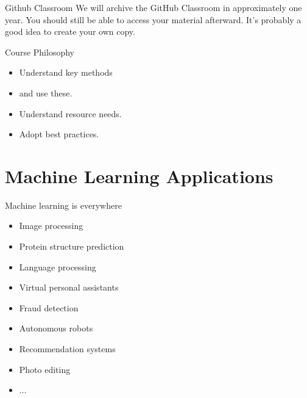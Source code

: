 \documentclass{beamer}
\begin{document}
    \begin{frame}{Github Classroom}
      We will archive the GitHub Classroom in approximately one year. You should still be able to
      access your material afterward. It's probably a good idea to create your own copy.
    \end{frame}

    \begin{frame}{Course Philosophy}
      \begin{itemize}
        \item Understand key methods 
        \item and use these.
        \item Understand resource needs.
        \item Adopt best practices.
      \end{itemize}
    \end{frame}

    \section{Machine Learning Applications}
    \begin{frame}{Machine learning is everywhere}
        \begin{itemize}
          \item Image processing
          \item Protein structure prediction
          \item Language processing
          \item Virtual personal assistants
          \item Fraud detection
          \item Autonomous robots
          \item Recommendation systems
          \item Photo editing
          \item $\dots$
        \end{itemize}
    \end{frame}
  
\end{document}
